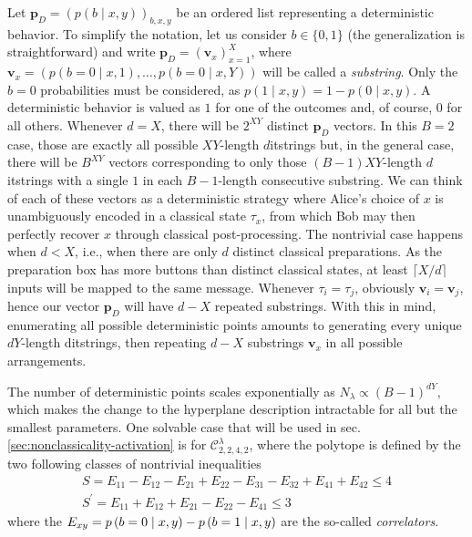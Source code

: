     Let $\mathbf{p}_D = \left( p(b \mid x, y) \right)_{b, x, y}$ be an ordered list representing a deterministic behavior. To simplify the notation, let us consider $b \in \{ 0, 1\}$ (the generalization is straightforward) and write $\mathbf{p}_D = \left( \mathbf{v}_x \right)_{x=1}^X$, where $\mathbf{v}_x = \left( p(b = 0 \mid x, 1), \ldots, p(b = 0 \mid x, Y ) \right)$ will be called a \emph{substring}. Only the $b=0$ probabilities must be considered, as $p(1 \mid x, y) = 1 - p(0 \mid x, y)$. A deterministic behavior is valued as $1$ for one of the outcomes and, of course, $0$ for all others. Whenever $d = X$, there will be $2^{XY}$ distinct $\mathbf{p}_D$ vectors. In this $B=2$ case, those are exactly all possible $XY$-length $d$itstrings but, in the general case, there will be $B^{XY}$ vectors corresponding to only those $(B-1)XY$-length $d$itstrings with a single $1$ in each $B-1$-length consecutive substring. We can think of each of these vectors as a deterministic strategy where Alice's choice of $x$ is unambiguously encoded in a classical state $\tau_x$, from which Bob may then perfectly recover $x$ through classical post-processing. The nontrivial case happens when $d < X$, i.e., when there are only $d$ distinct classical preparations. As the preparation box has more buttons than distinct classical states, at least $\lceil X/d \rceil$ inputs will be mapped to the same message. Whenever $\tau_i = \tau_j$, obviously $\mathbf{v}_i = \mathbf{v}_j$, hence our vector $\mathbf{p}_D$ will have $d - X$ repeated substrings. With this in mind, enumerating all possible deterministic points amounts to generating every unique $dY$-length ditstrings, then repeating $d-X$ substrings $\mathbf{v}_x$ in all possible arrangements.

    The number of deterministic points scales exponentially as $N_\lambda \propto (B-1)^{dY}$, which makes the change to the hyperplane description intractable for all but the smallest parameters. One solvable case that will be used in sec. \ref{sec:nonclassicality-activation} is for $\mathcal{C}^\lambda_{2,2,4,2}$, where the polytope is defined by the two following classes of nontrivial inequalities \cite{poderini_pamcriteria_2020}
    \begin{subequations}
        \begin{gather}
            S = E_{11} - E_{12} - E_{21} + E_{22} - E_{31} - E_{32} + E_{41} + E_{42} \leq 4 \label{eq:inequality-s}\\
            S^\prime = E_{11} + E_{12} + E_{21} - E_{22} - E_{41} \leq 3 
        \end{gather}
    \end{subequations}
    where the $E_{xy}=p \left( b=0 \mid x,y \right)-p \left( b=1 \mid x,y \right)$ are the so-called \emph{correlators}.

